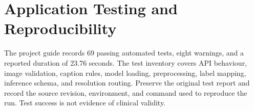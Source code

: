 \documentclass{article}
\begin{document}
\begin{table}[htbp]
\centering
\caption{Reported Classification Results on the Held-Out Test Partition ($N = 4,778$)}
\label{tab:app_summary_metrics}
\end{table}

\section{Application Testing and Reproducibility}
The project guide records 69 passing automated tests, eight warnings, and a reported duration of 23.76 seconds. The test inventory covers API behaviour, image validation, caption rules, model loading, preprocessing, label mapping, inference schema, and resolution routing. Preserve the original test report and record the source revision, environment, and command used to reproduce the run. Test success is not evidence of clinical validity.
\end{document}
